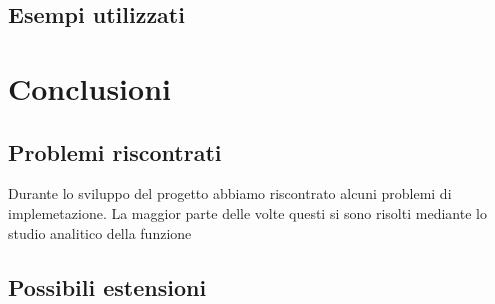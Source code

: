 \documentclass{article}
\begin{document}
\subsection{Esempi utilizzati}
\vspace{2mm}



\section{Conclusioni}
\vspace{5mm}
\subsection{Problemi riscontrati}
\vspace{2mm}

Durante lo sviluppo del progetto abbiamo riscontrato alcuni problemi di implemetazione. La maggior parte delle volte questi si sono risolti mediante lo studio analitico della funzione 
\subsection{Possibili estensioni}
\vspace{2mm}
\end{document}
